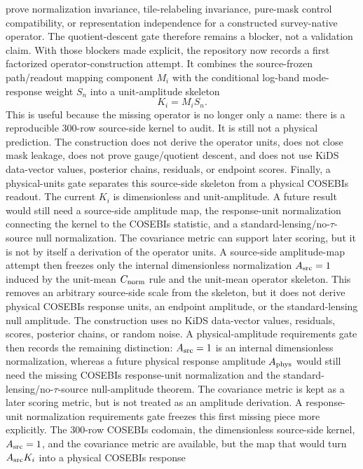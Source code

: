 \documentclass[11pt]{article}
\begin{document}
prove normalization invariance, tile-relabeling invariance, pure-mask
control compatibility, or representation independence for a constructed
survey-native operator. The quotient-descent gate therefore remains a blocker,
not a validation claim.
With those blockers made explicit, the repository now records a first
factorized operator-construction attempt. It combines the source-frozen
path/readout mapping component \(M_i\) with the conditional log-band
mode-response weight \(S_n\) into a unit-amplitude skeleton
\[
K_i = M_i S_n .
\]
This is useful because the missing operator is no longer only a name: there is
a reproducible 300-row source-side kernel to audit. It is still not a physical
prediction. The construction does not derive the operator units, does not close
mask leakage, does not prove gauge/quotient descent, and does not use KiDS
data-vector values, posterior chains, residuals, or endpoint scores.
Finally, a physical-units gate separates this source-side skeleton from a
physical COSEBIs readout. The current \(K_i\) is dimensionless and
unit-amplitude. A future result would still need a source-side amplitude map,
the response-unit normalization connecting the kernel to the COSEBIs statistic,
and a standard-lensing/no-\(\tau\)-source null normalization. The covariance
metric can support later scoring, but it is not by itself a derivation of the
operator units.
A source-side amplitude-map attempt then freezes only the internal
dimensionless normalization \(A_{\rm src}=1\) induced by the unit-mean
\(C_{\rm norm}\) rule and the unit-mean operator skeleton. This removes an
arbitrary source-side scale from the skeleton, but it does not derive physical
COSEBIs response units, an endpoint amplitude, or the standard-lensing null
amplitude. The construction uses no KiDS data-vector values, residuals, scores,
posterior chains, or random noise.
A physical-amplitude requirements gate then records the remaining distinction:
\(A_{\rm src}=1\) is an internal dimensionless normalization, whereas a future
physical response amplitude \(A_{\rm phys}\) would still need the missing
COSEBIs response-unit normalization and the standard-lensing/no-\(\tau\)-source
null-amplitude theorem. The covariance metric is kept as a later scoring
metric, but is not treated as an amplitude derivation.
A response-unit normalization requirements gate freezes this first missing
piece more explicitly. The 300-row COSEBIs codomain, the dimensionless
source-side kernel, \(A_{\rm src}=1\), and the covariance metric are available,
but the map that would turn \(A_{\rm src}K_i\) into a physical COSEBIs response
\end{document}
